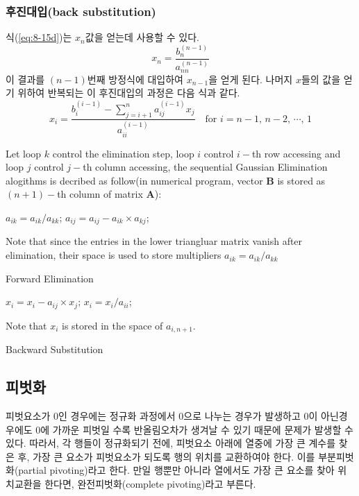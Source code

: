 \subsubsection{후진대입(back substitution)}
식(\ref{eq:8-15d})는 $x_{n}$값을 얻는데 사용할 수 있다.
\begin{equation}\label{eq:8-16}
x_{n}=\frac{b_{n}^{(n-1)}}{a_{nn}^{(n-1)}}
\end{equation}
이 결과를 $(n-1)$번째 방정식에 대입하여 $x_{n-1}$을 얻게 된다. 나머지 $x$들의 값을 얻기 위하여 반복되는 이 후진대입의 과정은 다음 식과 같다.
\begin{equation}\label{eq:8-17}
x_{i}=\frac{b_{i}^{(i-1)}-\sum\limits_{j=i+1}^{n}a_{ij}^{(i-1)}x_{j}}{a_{ii}^{(i-1)}}\quad\text{for $i=n-1$, $n-2$, $\cdots$, $1$}
\end{equation}

\begin{algorithm}
Let loop $k$ control the elimination step, loop $i$ control $i-$th row accessing and loop $j$ control $j-$th column accessing, the sequential Gaussian Elimination alogithms is decribed as follow(in numerical program, vector $\mathbf{B}$ is stored as $(n+1)-$th column of matrix $\mathbf{A}$):
\begin{algorithmic}
    \State $a_{ik}=a_{ik}/a_{kk}$;
      \State $a_{ij}=a_{ij}-a_{ik}\times a_{kj}$;
    \EndFor
  \EndFor
\EndFor
\end{algorithmic}
Note that since the entries in the lower triangluar matrix vanish after elimination, their space is used to store multipliers $a_{ik}=a_{ik}/a_{kk}$
\caption{Forward Elimination}
\end{algorithm}

\begin{algorithm}
\begin{algorithmic}
    \State $x_{i}=x_{i}-a_{ij}\times x_{j}$;
  \EndFor
  \State $x_{i}=x_{i}/a_{ii}$;
\EndFor
\end{algorithmic}
Note that $x_{i}$ is stored in the space of $a_{i,n+1}$.
\caption{Backward Substitution}
\end{algorithm}
\subsection{피벗화}
피벗요소가 0인 경우에는 정규화 과정에서 0으로 나누는 경우가 발생하고 0이 아닌경우에도 0에 가까운 피벗일 수록 반올림오차가 생겨날 수 있기 때문에 문제가 발생할 수 있다. 따라서, 각 행들이 정규화되기 전에, 피벗요소 아래에 열중에 가장 큰 계수를 찾은 후, 가장 큰 요소가 피벗요소가 되도록 행의 위치를 교환하여야 한다. 이를 부분피벗화(partial pivoting)라고 한다. 만일 행뿐만 아니라 열에서도 가장 큰 요소를 찾아 위치교환을 한다면, 완전피벗화(complete pivoting)라고 부른다.



